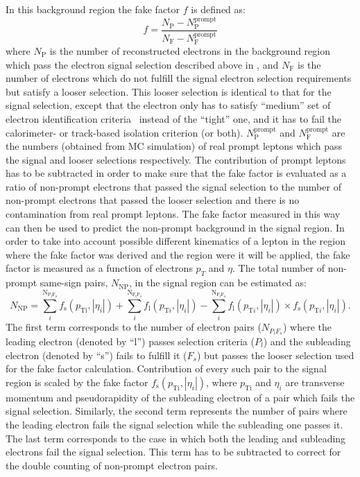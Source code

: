 In this background region the fake factor $f$ is defined as:
\begin{equation}
f = \frac{N_{\mathrm{P}} - N_{\mathrm{P}}^{\mathrm{prompt}}}{N_{\mathrm{F}}  - N_{\mathrm{F}}^{\mathrm{prompt}}}
\label{eq:fakefactor}
\end{equation}
where $N_{\mathrm{P}}$ is the number of reconstructed electrons in the background region which pass the electron signal selection
described above in , and $N_{\mathrm{F}}$ is the number of electrons which do not fulfill the 
signal electron selection requirements but satisfy a looser selection. This looser selection is identical to that for the signal selection, except 
that the electron only has to satisfy ``medium'' set of electron identification criteria~\cite{electron_tight} instead of the ``tight'' one,
and it has to fail the calorimeter- or track-based isolation criterion (or both).
$N_{\mathrm{P}}^{\mathrm{prompt}}$ and $N_{\mathrm{F}}^{\mathrm{prompt}}$ are the numbers (obtained from MC simulation) of real prompt
leptons which pass the signal and looser selections respectively.
The contribution of prompt leptons has to be subtracted in order to make sure that 
the fake factor is evaluated as a ratio of non-prompt electrons that passed the signal selection to
the number of non-prompt electrons that passed the looser selection and there is no contamination from real prompt leptons.
The fake factor measured in this way can then be used to predict the non-prompt background in the signal region.
In order to take into account possible different kinematics of a lepton in the region where the fake factor was derived 
and the region were it will be applied, the fake factor is measured as a function of electrons $p_T$ and $\eta$.
The total number of non-prompt same-sign pairs, $N_{\mathrm{NP}}$, in the signal region can be estimated as:
\begin{equation}
N_{\mathrm{NP}} = \sum_{i}^{\mathrm{N_{P_l F_s}}} f_{\mathrm{s}}(p_{\mathrm{Ti}},|\eta_{i}|) + \sum_{i}^{\mathrm{N_{F_l P_s}}} f_{\mathrm{l}}(p_{\mathrm{T}i},|\eta_{i}|) - \sum_{i}^{\mathrm{N_{F_l F_s}}} f_{\mathrm{l}}(p_{\mathrm{T}i},|\eta_{i}|) \times f_{\mathrm{s}}(p_{\mathrm{T}i},|\eta_{i}|)
\label{eq:fake_pred}.
\end{equation}
The first term corresponds to the number of electron pairs ($N_{P_l F_s}$) 
where the leading electron (denoted by ``l'') passes selection criteria ($P_l$) and the subleading electron (denoted by ``s'')
fails to fulfill it ($F_s$) but passes the looser selection used for the fake factor calculation. 
Contribution of every such pair to the signal region is scaled by the fake factor 
$f_{\mathrm{s}}(p_{\mathrm{Ti}},|\eta_{i}|)$, where $p_\mathrm{Ti}$ and $\eta_{i}$ are transverse momentum and pseudorapidity
of the subleading electron of a pair which fails the signal selection. 
Similarly, the second term represents the number of pairs where
the leading electron fails the signal selection while the subleading one passes it. 
The last term corresponds to the case in which both the leading
and subleading electrons fail the signal selection. This term has to be subtracted to correct for the double
counting of non-prompt electron pairs.

